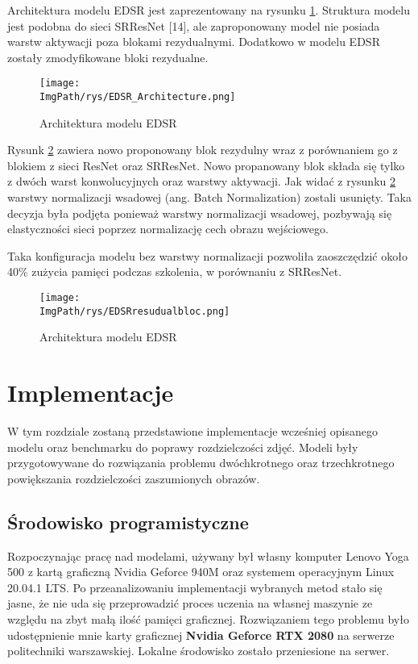 \documentclass[a4paper,12pt,twoside,openany]{report}
\newcommand{\ImgPath}{.}
\begin{document}
Architektura modelu EDSR jest zaprezentowany na  rysunku \ref{EDSR}. Struktura modelu jest podobna do sieci SRResNet [14], ale zaproponowany model nie posiada warstw aktywacji poza blokami rezydualnymi. Dodatkowo w modelu EDSR zostały  zmodyfikowane bloki rezydualne. 

	\begin{figure}[!htbp]
	\begin{center}
		\centering
		\texttt{[image: \\ImgPath/rys/EDSR\_Architecture.png]}
	\end{center}
	\caption{Architektura modelu EDSR}
	\label{EDSR}
\end{figure} 
\newpage
Rysunk \ref{EDSR_resBlok} zawiera nowo proponowany blok rezydulny wraz z porównaniem go z blokiem z sieci ResNet oraz SRResNet. Nowo propanowany blok składa się tylko z dwóch warst konwolucyjnych oraz warstwy aktywacji. Jak widać z rysunku \ref{EDSR_resBlok} warstwy normalizacji wsadowej (ang. Batch Normalization) zostali usunięty. Taka decyzja była podjęta ponieważ warstwy normalizacji wsadowej, pozbywają się elastyczności sieci poprzez normalizację cech obrazu wejściowego.

Taka konfiguracja modelu bez warstwy normalizacji pozwoliła zaoszczędzić około 40\% zużycia pamięci podczas szkolenia, w porównaniu z SRResNet.
\begin{figure}[!htbp]
	\begin{center}
		\centering
		\texttt{[image: \\ImgPath/rys/EDSRresudualbloc.png]}
	\end{center}
	\caption{Architektura modelu EDSR}
	\label{EDSR_resBlok}
\end{figure}

\chapter{Implementacje}
W tym rozdziale zostaną przedstawione implementacje wcześniej opisanego modelu oraz benchmarku do poprawy rozdzielczości zdjęć.  Modeli były przygotowywane do rozwiązania problemu dwóchkrotnego oraz trzechkrotnego powiększania rozdzielczości zaszumionych obrazów.

\section{Środowisko programistyczne}
Rozpoczynając pracę nad modelami, używany był własny komputer Lenovo Yoga 500 z kartą graficzną Nvidia Geforce 940M oraz systemem operacyjnym Linux 20.04.1 LTS. Po przeanalizowaniu implementacji wybranych metod stało się jasne, że nie uda się przeprowadzić proces uczenia na własnej maszynie ze względu na zbyt małą ilość pamięci graficznej. Rozwiązaniem tego problemu było udostępnienie mnie karty graficznej \textbf{Nvidia Geforce RTX 2080} na serwerze politechniki warszawskiej. Lokalne środowisko zostało przeniesione  na serwer.
\end{document}
